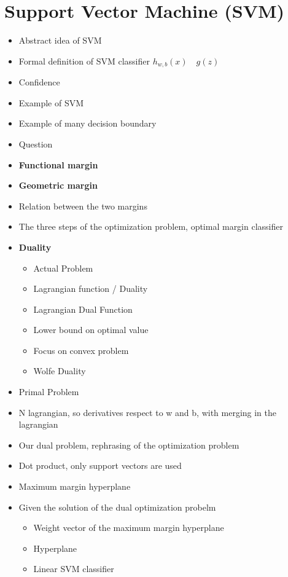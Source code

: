 \chapter{Support Vector Machine (SVM)}
\begin{itemize}
    \item Abstract idea of SVM
    \item Formal definition of SVM classifier \(h_{w, b}(x) \quad g(z)\)
    \item Confidence
    \item Example of SVM
    \item Example of many decision boundary
    \item Question
    \item \textbf{Functional margin}
    \item \textbf{Geometric margin}
    \item Relation between the two margins
    \item The three steps of the optimization problem, optimal margin classifier
    \item \textbf{Duality}
    \begin{itemize}
        \item Actual Problem
        \item Lagrangian function / Duality
        \item Lagrangian Dual Function
        \item Lower bound on optimal value
        \item Focus on convex problem
        \item Wolfe Duality
    \end{itemize}
    \item Primal Problem
    \item N lagrangian, so derivatives respect to w and b, with merging in the lagrangian
    \item Our dual problem, rephrasing of the optimization problem
    \item Dot product, only support vectors are used
    \item Maximum margin hyperplane
    \item Given the solution of the dual optimization probelm
    \begin{itemize}
        \item Weight vector of the maximum margin hyperplane
        \item Hyperplane
        \item Linear SVM classifier
    \end{itemize}

\end{itemize}
